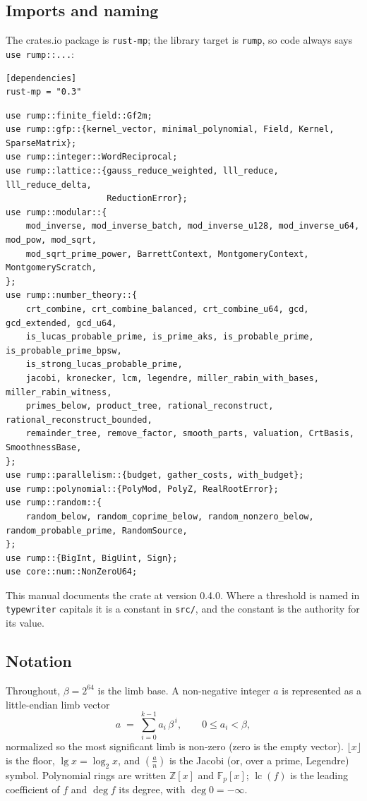\documentclass[11pt]{article}
\newcommand{\code}[1]{\texttt{#1}}
\newcommand{\Z}{\mathbb{Z}}
\newcommand{\F}{\mathbb{F}}
\newcommand{\lc}{\operatorname{lc}}
\newcommand{\jac}[2]{\left(\frac{#1}{#2}\right)}
\begin{document}
\subsection{Imports and naming}

The crates.io package is \code{rust-mp}; the library target is \code{rump},
so code always says \code{use rump::...}:

\begin{lstlisting}
[dependencies]
rust-mp = "0.3"
\end{lstlisting}

\begin{lstlisting}
use rump::finite_field::Gf2m;
use rump::gfp::{kernel_vector, minimal_polynomial, Field, Kernel, SparseMatrix};
use rump::integer::WordReciprocal;
use rump::lattice::{gauss_reduce_weighted, lll_reduce, lll_reduce_delta,
                    ReductionError};
use rump::modular::{
    mod_inverse, mod_inverse_batch, mod_inverse_u128, mod_inverse_u64, mod_pow, mod_sqrt,
    mod_sqrt_prime_power, BarrettContext, MontgomeryContext, MontgomeryScratch,
};
use rump::number_theory::{
    crt_combine, crt_combine_balanced, crt_combine_u64, gcd, gcd_extended, gcd_u64,
    is_lucas_probable_prime, is_prime_aks, is_probable_prime, is_probable_prime_bpsw,
    is_strong_lucas_probable_prime,
    jacobi, kronecker, lcm, legendre, miller_rabin_with_bases, miller_rabin_witness,
    primes_below, product_tree, rational_reconstruct, rational_reconstruct_bounded,
    remainder_tree, remove_factor, smooth_parts, valuation, CrtBasis, SmoothnessBase,
};
use rump::parallelism::{budget, gather_costs, with_budget};
use rump::polynomial::{PolyMod, PolyZ, RealRootError};
use rump::random::{
    random_below, random_coprime_below, random_nonzero_below, random_probable_prime, RandomSource,
};
use rump::{BigInt, BigUint, Sign};
use core::num::NonZeroU64;
\end{lstlisting}

This manual documents the crate at version 0.4.0. Where a threshold
is named in \code{typewriter} capitals it is a constant in \code{src/}, and
the constant is the authority for its value.

\subsection{Notation}

Throughout, $\beta = 2^{64}$ is the limb base. A non-negative integer $a$ is
represented as a little-endian limb vector
\begin{equation}
a \;=\; \sum_{i=0}^{k-1} a_i\,\beta^{\,i},
\qquad 0 \le a_i < \beta,
\end{equation}
normalized so the most significant limb is non-zero (zero is the empty
vector). $\lfloor x \rfloor$ is the floor, $\lg x = \log_2 x$, and
$\jac{a}{n}$ is the Jacobi (or, over a prime, Legendre) symbol. Polynomial
rings are written $\Z[x]$ and $\F_p[x]$; $\lc(f)$ is the leading coefficient
of $f$ and $\deg f$ its degree, with $\deg 0 = -\infty$.
\end{document}
